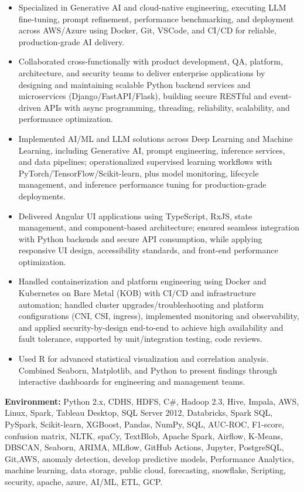 \begin{itemize}
  \item Specialized in Generative AI and cloud-native engineering, executing LLM fine-tuning, prompt
        refinement, performance benchmarking, and deployment across AWS/Azure using Docker, Git,
        VSCode, and CI/CD for reliable, production-grade AI delivery.

  \item Collaborated cross-functionally with product development, QA, platform, architecture, and
        security teams to deliver enterprise applications by designing and maintaining scalable Python
        backend services and microservices (Django\slash FastAPI\slash Flask), building secure RESTful and
        event-driven APIs with async programming, threading, reliability, scalability, and
        performance optimization.

  \item Implemented AI/ML and LLM solutions across Deep Learning and Machine Learning, including
        Generative AI, prompt engineering, inference services, and data pipelines; operationalized
        supervised learning workflows with PyTorch/TensorFlow/Scikit-learn, plus model monitoring,
        lifecycle management, and inference performance tuning for production-grade deployments.

  \item Delivered Angular UI applications using TypeScript, RxJS, state management, and
        component-based architecture; ensured seamless integration with Python backends and secure
        API consumption, while applying responsive UI design, accessibility standards, and
        front-end performance optimization.

  \item Handled containerization and platform engineering using Docker and Kubernetes on Bare Metal
        (KOB) with CI/CD and infrastructure automation; handled cluster upgrades/troubleshooting and
        platform configurations (CNI, CSI, ingress), implemented monitoring and observability, and
        applied security-by-design end-to-end to achieve high availability and fault tolerance,
        supported by unit/integration testing, code reviews.

  \item Used R for advanced statistical visualization and correlation analysis. Combined Seaborn,
        Matplotlib, and Python to present findings through interactive dashboards for engineering
        and management teams.
\end{itemize}

\textbf{Environment:} Python 2.x, CDHS, HDFS, C\#, Hadoop 2.3, Hive, Impala, AWS, Linux, Spark,
Tableau Desktop, SQL Server 2012, Databricks, Spark SQL, PySpark, Scikit-learn, XGBoost, Pandas,
NumPy, SQL, AUC-ROC, F1-score, confusion matrix, NLTK, spaCy, TextBlob, Apache Spark, Airflow,
K-Means, DBSCAN, Seaborn, ARIMA, MLflow, GitHub Actions, Jupyter, PostgreSQL, Git,AWS, anomaly
detection, develop predictive models, Performance Analytics, machine learning, data storage, public
cloud, forecasting, snowflake, Scripting, security, apache, azure, AI/ML, ETL, GCP.
